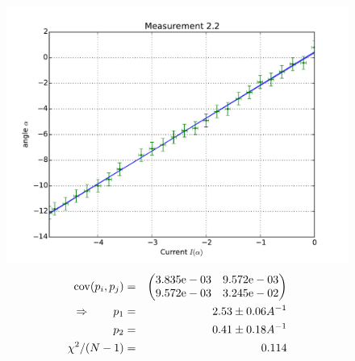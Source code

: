 \begin{figure}
    \begin{centering}
        \includegraphics[width=18cm]{figures/fig22}
\captionsetup{singlelinecheck=off} 
\caption[.]{
\begin{eqnarray*}
    \mathrm{cov}(p_i, p_j) &=& 
    \begin{pmatrix}
        3.835\mathrm{e}-03 &9.572\mathrm{e}-03 \\
        9.572\mathrm{e}-03 &3.245\mathrm{e}-02 \\
    \end{pmatrix}
\\ \Rightarrow \qquad
    p_1 &=& 2.53 \pm 0.06 A^{-1}\\
    p_2 &=& 0.41 \pm 0.18 A^{-1} \\
    \chi ^2/(N-1) &=& 0.114
\end{eqnarray*}
}


    \end{centering}
\end{figure}

